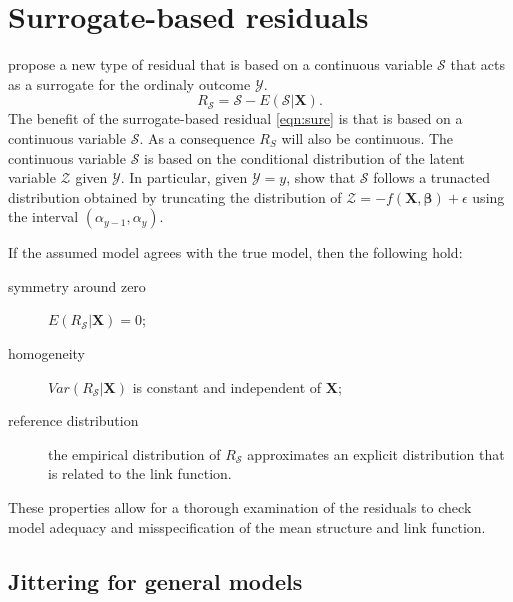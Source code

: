 \section{Surrogate-based residuals}
\label{sec:surrogate}

\citet{residuals-liu-2017} propose a new type of residual that is based on a continuous variable $\mathcal{S}$ that acts as a surrogate for the ordinaly outcome $\mathcal{Y}$.
\begin{equation}
\label{eqn:sure}
R_\mathcal{S} = \mathcal{S} - E\left(\mathcal{S} | \boldsymbol{X}\right).
\end{equation}
The benefit of the surrogate-based residual \eqref{eqn:sure} is that is based on a continuous variable $\mathcal{S}$. As a consequence $R_S$ will also be continuous. The continuous variable $\mathcal{S}$ is based on the conditional distribution of the latent variable $\mathcal{Z}$ given $\mathcal{Y}$. In particular, given $\mathcal{Y} = y$, \citet{residuals-liu-2017} show that $\mathcal{S}$ follows a trunacted distribution obtained by truncating the distribution of $\mathcal{Z} = -f\left(\boldsymbol{X}, \boldsymbol{\beta}\right) + \epsilon$ using the interval $\left(\alpha_{y - 1}, \alpha_y\right)$.

If the assumed model agrees with the true model, then the following hold:
\begin{description}
  \item[symmetry around zero] $E\left(R_\mathcal{S} | \boldsymbol{X}\right) = 0$;
  \item[homogeneity] $Var\left(R_\mathcal{S} | \boldsymbol{X}\right)$ is constant and independent of $\boldsymbol{X}$;
  \item[reference distribution] the empirical distribution of $R_\mathcal{S}$ approximates an explicit distribution that is related to the link function.
\end{description}
These properties allow for a thorough examination of the residuals to check model adequacy and misspecification of the mean structure and link function.


\subsection{Jittering for general models}

